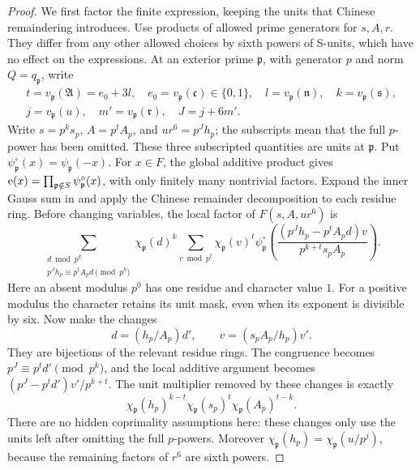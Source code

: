\begin{proof}
We first factor the finite expression, keeping the units that Chinese
remaindering introduces.  Use products of allowed prime generators for
\(s,A,r\).  They differ from any other allowed choices by sixth powers
of S-units, which have no effect on the expressions.  At an exterior
prime \(\mathfrak p\), with generator \(p\) and norm \(Q=q_{\mathfrak p}\),
write
\[
 \begin{gathered}
 t=v_{\mathfrak p}(\mathfrak A)=e_0+3l,\quad
 e_0=v_{\mathfrak p}(\mathfrak c)\in\{0,1\},\quad
 l=v_{\mathfrak p}(\mathfrak n),\quad k=v_{\mathfrak p}(\mathfrak s),\\
 j=v_{\mathfrak p}(u),\quad m'=v_{\mathfrak p}(\mathfrak r),
 \quad J=j+6m'.
 \end{gathered}
\]
Write \(s=p^ks_p\), \(A=p^tA_p\), and \(ur^6=p^Jh_p\); the subscripts
mean that the full \(p\)-power has been omitted.  These three subscripted
quantities are units at \(\mathfrak p\).  Put
\(\psi_{\mathfrak p}^{\circ}(x)=\psi_{\mathfrak p}(-x)\).
For \(x\in F\), the global additive product gives
\(\mathrm{e}(x)=\prod_{\mathfrak p\notin S}\psi_{\mathfrak p}^{\circ}(x)\),
with only finitely many nontrivial factors.  Expand the inner Gauss sum
in  and apply the Chinese remainder
decomposition to each residue ring.  Before changing variables, the local
factor of \(F(s,A,ur^6)\) is
\[
 \sum_{\substack{d\bmod p^k\\p^Jh_p\equiv p^tA_p d\pmod{p^k}}}
 \chi_{\mathfrak p}(d)^k
 \sum_{v\bmod p^t}\chi_{\mathfrak p}(v)^t
 \psi_{\mathfrak p}^{\circ}\!\left(
  \frac{(p^Jh_p-p^tA_p d)v}{p^{k+t}s_pA_p}\right).
\]
Here an absent modulus \(p^0\) has one residue and character value \(1\).
For a positive modulus the character retains its unit mask, even when
its exponent is divisible by six.  Now make the changes
\[
 d=(h_p/A_p)d',\qquad v=(s_pA_p/h_p)v'.
\]
They are bijections of the relevant residue rings.  The congruence becomes
\(p^J\equiv p^t d'\pmod{p^k}\), and the local additive argument becomes
\((p^J-p^td')v'/p^{k+t}\).  The unit multiplier removed by these changes
is exactly
\begin{equation}
 \chi_{\mathfrak p}(h_p)^{k-t}
 \chi_{\mathfrak p}(s_p)^t
 \chi_{\mathfrak p}(A_p)^{t-k}.
\label{eq:Euler-CRT-unit}
\end{equation}
There are no hidden coprimality assumptions here: these changes only use
the units left after omitting the full \(p\)-powers.  Moreover
\(\chi_{\mathfrak p}(h_p)=\chi_{\mathfrak p}(u/p^j)\), because the
remaining factors of \(r^6\) are sixth powers.


\end{proof}
